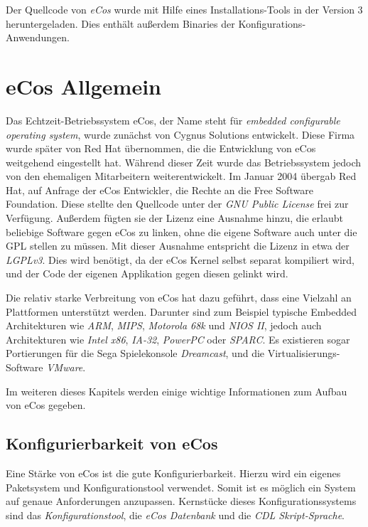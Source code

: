 \documentclass[
  a4paper,					%
  twoside,
  DIV=calc,     				%
  bibliography=totoc,
  cleardoublepage=empty,
  ngerman,     					%
  final       					%
]{scrbook}
\begin{document}
Der Quellcode von \emph{eCos} wurde mit Hilfe eines Installations-Tools in der Version 3 heruntergeladen. Dies enthält außerdem Binaries der Konfigurations-Anwendungen.










\chapter{eCos Allgemein}
\label{sec:eCos}
Das Echtzeit-Betriebssystem eCos, der Name steht für \emph{embedded configurable operating system}, wurde zunächst von Cygnus Solutions entwickelt. Diese Firma wurde später von Red Hat übernommen, die die Entwicklung von eCos weitgehend eingestellt hat. Während dieser Zeit wurde das Betriebssystem jedoch von den ehemaligen Mitarbeitern weiterentwickelt. Im Januar 2004 übergab Red Hat, auf Anfrage der eCos Entwickler, die Rechte an die Free Software Foundation. Diese stellte den Quellcode unter der \emph{GNU Public License} frei zur Verfügung. Außerdem fügten sie der Lizenz eine Ausnahme hinzu, die erlaubt beliebige Software gegen eCos zu linken, ohne die eigene Software auch unter die GPL stellen zu müssen. Mit dieser Ausnahme entspricht die Lizenz in etwa der \emph{LGPLv3}. Dies wird benötigt, da der eCos Kernel selbst separat kompiliert wird, und der Code der eigenen Applikation gegen diesen gelinkt wird.

Die relativ starke Verbreitung von eCos hat dazu geführt, dass eine Vielzahl an Plattformen unterstützt werden. Darunter sind zum Beispiel typische Embedded Architekturen wie \emph{ARM}, \emph{MIPS}, \emph{Motorola 68k} und \emph{NIOS II}, jedoch auch Architekturen wie \emph{Intel x86}, \emph{IA-32}, \emph{PowerPC} oder \emph{SPARC}. Es existieren sogar Portierungen für die Sega Spielekonsole \emph{Dreamcast}, und die Virtualisierungs-Software \emph{VMware}.

Im weiteren dieses Kapitels werden einige wichtige Informationen zum Aufbau von eCos gegeben.

\section{Konfigurierbarkeit von eCos}
\label{sec:config}
Eine Stärke von eCos ist die gute Konfigurierbarkeit. Hierzu wird ein eigenes Paketsystem und Konfigurationstool verwendet. Somit ist es möglich ein System auf genaue Anforderungen anzupassen. Kernstücke dieses Konfigurationssystems sind das \emph{Konfigurationstool}, die \emph{eCos Datenbank} und die \emph{CDL Skript-Sprache}.
\end{document}
